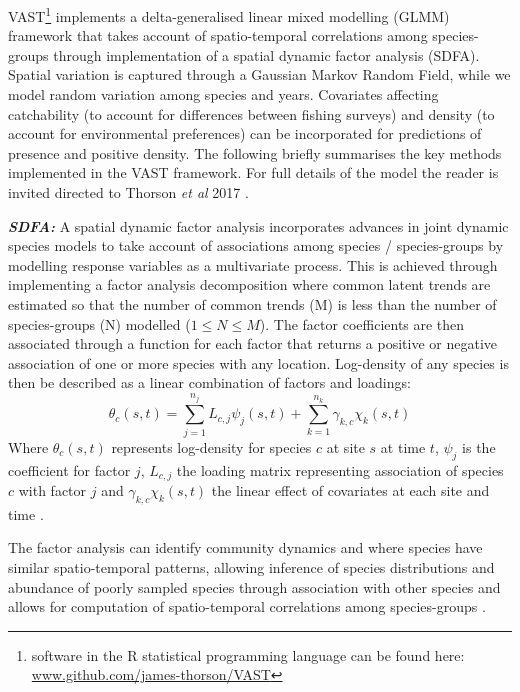 \documentclass{nature}
\begin{document}
\begin{linenumbers}
VAST\footnote{software in the R statistical programming language can be found
	here: \url{www.github.com/james-thorson/VAST}} implements a
delta-generalised linear mixed modelling (GLMM) framework that takes account of
spatio-temporal correlations among species-groups through implementation of a
spatial dynamic factor analysis (SDFA). Spatial variation is captured through a
Gaussian Markov Random Field, while we model random variation among species and
years. Covariates affecting catchability (to account for differences between
fishing surveys) and density (to account for environmental preferences) can be
incorporated for predictions of presence and positive density. The following
briefly summarises the key methods implemented in the VAST framework. For full
details of the model the reader is invited directed to Thorson \textit{et al}
2017 \cite{Thorson2017}.

\textbf{\textit{SDFA:}} A spatial dynamic factor analysis incorporates
advances in joint dynamic species models \cite{Thorson2017} to take account
of associations among species / species-groups by modelling response variables
as a multivariate process. This is achieved through implementing a factor
analysis decomposition where common latent trends are estimated so that the
number of common trends (M) is less than the number of species-groups (N)
modelled ($1 \leq N \leq M$). The factor coefficients are then associated
through a function for each factor that returns a positive or negative
association of one or more species with any location. Log-density of any
species is then be described as a linear combination of factors and loadings:
	\begin{equation}
		\theta_{c}(s,t) = \sum_{j=1}^{n_{j}}
		L_{c,j}\psi_{j}(s,t) +\sum_{k=1}^{n_{k}}
		\gamma_{k,c}\chi_{k}(s,t)
	\end{equation}
Where $\theta_{c}(s,t)$ represents log-density for species $c$ at site $s$ at
time $t$, $\psi_{j}$ is the coefficient for factor $j$, $L_{c,j}$ the loading
matrix representing association of species $c$ with factor $j$ and
$\gamma_{k,c}\chi_{k}(s,t)$ the linear effect of covariates at each site and
time \cite{Thorson2016b}. 

The factor analysis can identify community dynamics and where species have
similar spatio-temporal patterns, allowing inference of species distributions
and abundance of poorly sampled species through association with other species
and allows for computation of spatio-temporal correlations among species-groups
\cite{Thorson2016b}.


\end{linenumbers}
\end{document}
